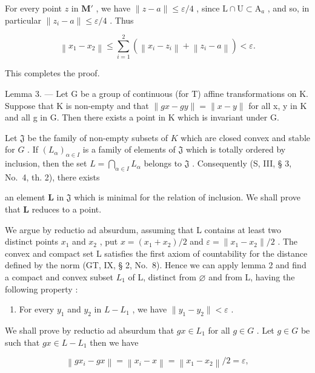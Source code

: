 For every point \(z\) in \(\mathbf{M}'\) , we have \(\| z - a \| \leqslant \varepsilon / 4\) , since \(\mathrm{L} \cap \mathrm{U} \subset \mathrm{A}_a\) , and so, in particular \(\| z_i - a \| \leqslant \varepsilon / 4\) . Thus

\[
\left\| x _ {1} - x _ {2} \right\| \leqslant \sum_ {i = 1} ^ {2} \left(\left\| x _ {i} - z _ {i} \right\| + \left\| z _ {i} - a \right\|\right) <   \varepsilon .
\]

This completes the proof.

Lemma 3. --- Let G be a group of continuous (for T) affine transformations on K. Suppose that K is non-empty and that \(\|gx - gy\| = \|x - y\|\) for all x, y in K and all g in G. Then there exists a point in K which is invariant under G.

Let \(\mathfrak{J}\) be the family of non-empty subsets of \(K\) which are closed convex and stable for \(G\) . If \((L_{\alpha})_{\alpha \in I}\) is a family of elements of \(\mathfrak{J}\) which is totally ordered by inclusion, then the set \(L = \bigcap_{\alpha \in I} L_{\alpha}\) belongs to \(\mathfrak{J}\) . Consequently (S, III, § 3, No.~4, th. 2), there exists

an element \(\mathbf{L}\) in \(\mathfrak{J}\) which is minimal for the relation of inclusion. We shall prove that \(\mathbf{L}\) reduces to a point.

We argue by reductio ad absurdum, assuming that L contains at least two distinct points \(x_{1}\) and \(x_{2}\) , put \(x = (x_{1} + x_{2})/2\) and \(\varepsilon = \|x_{1} - x_{2}\|/2\) . The convex and compact set L satisfies the first axiom of countability for the distance defined by the norm (GT, IX, § 2, No.~8). Hence we can apply lemma 2 and find a compact and convex subset \(L_{1}\) of L, distinct from \(\varnothing\) and from L, having the following property :

\begin{enumerate}
\def\labelenumi{(\Alph{enumi})}
\tightlist
\item
  For every \(y_{1}\) and \(y_{2}\) in \(L - L_{1}\) , we have \(\|y_{1} - y_{2}\| < \varepsilon\) .
\end{enumerate}

We shall prove by reductio ad absurdum that \(gx \in L_{1}\) for all \(g \in G\) . Let \(g \in G\) be such that \(gx \in L - L_{1}\) then we have

\[
\left\| g x _ {i} - g x \right\| = \left\| x _ {i} - x \right\| = \left\| x _ {1} - x _ {2} \right\| / 2 = \varepsilon ,
\]

